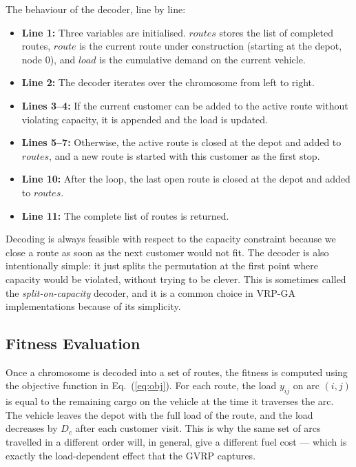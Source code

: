 \documentclass [a4paper, 11pt, titlepage] {article}
\begin{document}
The behaviour of the decoder, line by line:

\begin{itemize}
    \item \textbf{Line 1:} Three variables are initialised. $routes$ stores the list of completed routes, $route$ is the current route under construction (starting at the depot, node $0$), and $load$ is the cumulative demand on the current vehicle.
    \item \textbf{Line 2:} The decoder iterates over the chromosome from left to right.
    \item \textbf{Lines 3--4:} If the current customer can be added to the active route without violating capacity, it is appended and the load is updated.
    \item \textbf{Lines 5--7:} Otherwise, the active route is closed at the depot and added to $routes$, and a new route is started with this customer as the first stop.
    \item \textbf{Line 10:} After the loop, the last open route is closed at the depot and added to $routes$.
    \item \textbf{Line 11:} The complete list of routes is returned.
\end{itemize}

Decoding is always feasible with respect to the capacity constraint because we close a route as soon as the next customer would not fit. The decoder is also intentionally simple: it just splits the permutation at the first point where capacity would be violated, without trying to be clever. This is sometimes called the \emph{split-on-capacity} decoder, and it is a common choice in VRP-GA implementations because of its simplicity.

\subsection{Fitness Evaluation}
\label{sec:fitness}

Once a chromosome is decoded into a set of routes, the fitness is computed using the objective function in Eq.~(\ref{eq:obj}). For each route, the load $y_{ij}$ on arc $(i,j)$ is equal to the remaining cargo on the vehicle at the time it traverses the arc. The vehicle leaves the depot with the full load of the route, and the load decreases by $D_c$ after each customer visit. This is why the same set of arcs travelled in a different order will, in general, give a different fuel cost --- which is exactly the load-dependent effect that the GVRP captures.
\end{document}
